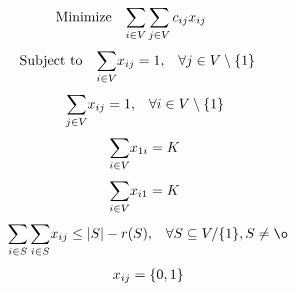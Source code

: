 \documentclass[a4paper, 12pt]{report}
\begin{document}
\begin{equation}
    \begin{array}{ll@{}ll}
        \text{Minimize} & \displaystyle\sum\limits_{i \in V}\sum\limits_{j \in V} c_{ij}&x_{ij} &\\
    \end{array}
\end{equation}
\begin{equation}
    \begin{array}{ll@{}ll}
        \text{Subject to}&\displaystyle\sum\limits_{i \in V}   &x_{ij} = 1,  &\forall j \in V \setminus \{1\}\\
    \end{array}
\end{equation}
\begin{equation}
    \begin{array}{ll@{}ll}
        & \displaystyle\sum\limits_{j \in V}   &x_{ij} = 1,  &\forall i \in V \setminus \{1\}\\
    \end{array}
\end{equation}
\begin{equation}
    \begin{array}{ll@{}ll}
        & \displaystyle\sum\limits_{i \in V}   &x_{1i} = K\\
    \end{array}
\end{equation}
\begin{equation}
    \begin{array}{ll@{}ll}
        & \displaystyle\sum\limits_{i \in V}   &x_{i1} = K\\
    \end{array}
\end{equation}
\begin{equation}
    \begin{array}{ll@{}ll@{}ll}
        & \displaystyle\sum\limits_{i \in S}\sum\limits_{i \in S}  &x_{ij} \leq |S| - r(S), &\forall S \subseteq V/ \{1\} , S \neq \o \\
    \end{array}
\end{equation}
\begin{equation}
    \begin{array}{ll@{}ll@{}ll}
        & x_{ij} = \{0,1\}\\
    \end{array}
\end{equation}

\vspace{1cm}
\end{document}
